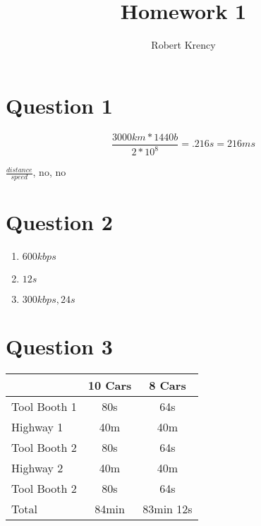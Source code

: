 \documentclass{article}
\date{}
\author{Robert Krency}
\title{Homework 1}
\begin{document}
\maketitle
\thispagestyle{fancy}

\section*{Question 1}

\begin{equation}
    \frac{3000km * 1440b}{2 * 10^8} = .216s = 216ms
\end{equation}

$\frac{distance}{speed}$, no, no

\section*{Question 2}

\begin{enumerate}[label=\Alph*.)]
    \item $600 kbps$
    \item $12s$
    \item $300 kbps, 24s$
\end{enumerate}

\section*{Question 3}

\begin{tabular}{l | c | c}
     & 10 Cars & 8 Cars      \\ \hline
    Tool Booth 1 & 80s & 64s \\
    Highway 1 & 40m & 40m    \\
    Tool Booth 2 & 80s & 64s \\
    Highway 2 & 40m & 40m    \\
    Tool Booth 2 & 80s & 64s \\ \hline
    Total & 84min & 83min 12s 
\end{tabular}
\end{document}
